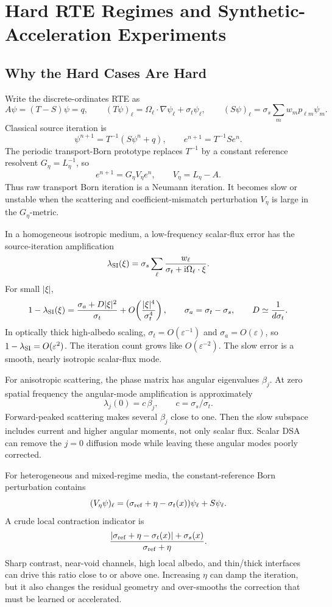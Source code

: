 \documentclass[11pt]{article}
\newcommand{\ii}{\mathrm{i}}
\begin{document}
\section{Hard RTE Regimes and Synthetic-Acceleration Experiments}

\subsection{Why the Hard Cases Are Hard}

Write the discrete-ordinates RTE as
\[
  A\psi=(T-S)\psi=q,
  \qquad
  (T\psi)_\ell=\Omega_\ell\cdot\nabla\psi_\ell+\sigma_t\psi_\ell,
  \qquad
  (S\psi)_\ell=\sigma_s\sum_m w_m p_{\ell m}\psi_m .
\]
Classical source iteration is
\[
  \psi^{n+1}=T^{-1}(S\psi^n+q),
  \qquad
  e^{n+1}=T^{-1}Se^n .
\]
The periodic transport-Born prototype replaces \(T^{-1}\) by a constant
reference resolvent \(G_\eta=L_\eta^{-1}\), so
\[
  e^{n+1}=G_\eta V_\eta e^n,\qquad V_\eta=L_\eta-A .
\]
Thus raw transport Born iteration is a Neumann iteration. It becomes slow or
unstable when the scattering and coefficient-mismatch perturbation
\(V_\eta\) is large in the \(G_\eta\)-metric.

In a homogeneous isotropic medium, a low-frequency scalar-flux error has the
source-iteration amplification
\[
  \lambda_{\rm SI}(\xi)
  =
  \sigma_s\sum_\ell
  \frac{w_\ell}{\sigma_t+\ii\Omega_\ell\cdot\xi}.
\]
For small \(|\xi|\),
\[
  1-\lambda_{\rm SI}(\xi)
  =
  \frac{\sigma_a+D|\xi|^2}{\sigma_t}
  +O\!\left(\frac{|\xi|^4}{\sigma_t^4}\right),
  \qquad
  \sigma_a=\sigma_t-\sigma_s,\qquad
  D\simeq\frac{1}{d\sigma_t}.
\]
In optically thick high-albedo scaling, \(\sigma_t=O(\varepsilon^{-1})\) and
\(\sigma_a=O(\varepsilon)\), so \(1-\lambda_{\rm SI}=O(\varepsilon^2)\).
The iteration count grows like \(O(\varepsilon^{-2})\). The slow error is a
smooth, nearly isotropic scalar-flux mode.

For anisotropic scattering, the phase matrix has angular eigenvalues
\(\beta_j\). At zero spatial frequency the angular-mode amplification is
approximately
\[
  \lambda_j(0)=c\,\beta_j,\qquad c=\sigma_s/\sigma_t .
\]
Forward-peaked scattering makes several \(\beta_j\) close to one. Then the
slow subspace includes current and higher angular moments, not only scalar
flux. Scalar DSA can remove the \(j=0\) diffusion mode while leaving these
angular modes poorly corrected.

For heterogeneous and mixed-regime media, the constant-reference Born
perturbation contains
\[
  (V_\eta\psi)_\ell
  =
  (\sigma_{\rm ref}+\eta-\sigma_t(x))\psi_\ell
  +S\psi_\ell .
\]
A crude local contraction indicator is
\[
  \frac{
    |\sigma_{\rm ref}+\eta-\sigma_t(x)|+\sigma_s(x)
  }{
    \sigma_{\rm ref}+\eta
  } .
\]
Sharp contrast, near-void channels, high local albedo, and thin/thick
interfaces can drive this ratio close to or above one. Increasing \(\eta\) can
damp the iteration, but it also changes the residual geometry and over-smooths
the correction that must be learned or accelerated.
\end{document}

